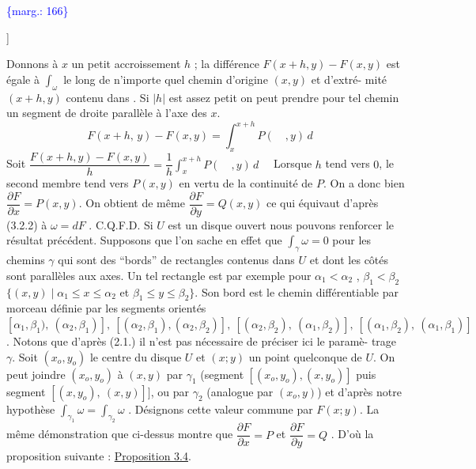 \documentclass[11pt]{article}
\newcommand{\scanpage}[1]{\par\bigskip\noindent{\small\sffamily[scan #1]}\par}
\newcommand{\mspage}[1]{{\small\sffamily[p.\,#1]}}
\newcommand{\margin}[1]{\textcolor{blue}{\{\textsf{marg.:} #1\}}}
\newcommand{\uline}[1]{\underline{#1}}
\newcommand{\unsure}[1]{[#1?]}
\begin{document}
\margin{166}

\clearpage
\scanpage{119/167}
\mspage{\unsure{- 6 -}}

Donnons à $x$ un petit accroissement $h$ ; la différence $F(x+h,y) - F(x,y)$
est égale à $\int_\omega$ le long de n'importe quel chemin d'origine $(x,y)$ et d'extré-%
mité $(x+h,y)$ contenu dans \quad . Si $|h|$ est assez petit on peut prendre pour
tel chemin un segment de droite parallèle à l'axe des $x$.
\[ F(x+h,\,y) - F(x,y) = \int_x^{x+h} P(\quad ,y)\, d \quad \]
Soit \quad $\dfrac{F(x+h,y) - F(x,y)}{h} = \dfrac{1}{h}\displaystyle\int_x^{x+h} P(\quad ,y)\, d \quad$
Lorsque $h$ tend vers $0$, le second membre tend vers $P(x,y)$ en vertu de la
continuité de $P$. On a donc bien $\dfrac{\partial F}{\partial x} = P(x,y)$. On obtient de même $\dfrac{\partial F}{\partial y} = Q(x,y)$
ce qui équivaut d'après (3.2.2) à $\omega = dF$ . C.Q.F.D.
Si $U$ est un disque ouvert nous pouvons renforcer le résultat précédent.
Supposons que l'on sache en effet que $\int_\gamma \omega = 0$ pour les chemins $\gamma$ qui
sont des ``bords'' de rectangles contenus dans $U$ et dont les côtés sont
parallèles aux axes. Un tel rectangle est par exemple pour $\alpha_1 < \alpha_2$ ,
$\beta_1 < \beta_2$ \quad $\{(x,y) \mid \alpha_1 \leq x \leq \alpha_2$ et $\beta_1 \leq y \leq \beta_2\}$. Son bord est le chemin
différentiable par morceau définie par les segments orientés
$[\alpha_1,\beta_1),\ (\alpha_2,\beta_1)],\ [(\alpha_2,\beta_1),(\alpha_2,\beta_2)],\ [(\alpha_2,\beta_2),\ (\alpha_1,\beta_2)],\ [(\alpha_1,\beta_2),\ (\alpha_1,\beta_1)]$.
Notons que d'après (2.1.) il n'est pas nécessaire de préciser ici le paramè-%
trage $\gamma$. Soit $(x_o,y_o)$ le centre du disque $U$ et $(x;y)$ un point quelconque
de $U$. On peut joindre $(x_o,y_o)$ à $(x,y)$ par $\gamma_1$ (segment $[(x_o,y_o),(x,y_o)]$
puis segment $[(x,y_o),\ (x,y)]]$, ou par $\gamma_2$ (analogue par $(x_o,y)$) et d'après
notre hypothèse $\int_{\gamma_1} \omega = \int_{\gamma_2} \omega$ . Désignons cette valeur commune par $F(x;y)$.
La même démonstration que ci-dessus montre que $\dfrac{\partial F}{\partial x} = P$ et $\dfrac{\partial F}{\partial y} = Q$ .
D'où la proposition suivante :
\uline{Proposition 3.4}.
\end{document}
